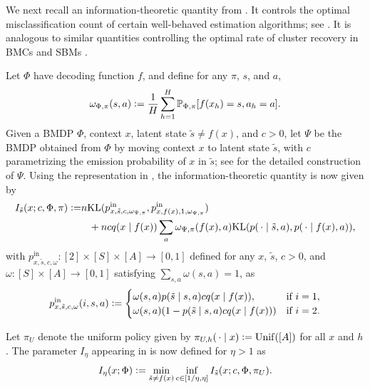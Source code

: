 \documentclass[11pt]{article}
\newcommand{\eqdef}{\vcentcolon=}
\newcommand{\mbbP}{\mathbb{P}}
\newcommand{\KL}{\textnormal{KL}}
\theoremstyle{definition}
\theoremstyle{definition}
\begin{document}
We next recall an information-theoretic quantity from \cite{Jedra:2022}.
It controls the optimal misclassification count of certain well-behaved estimation algorithms; see \cite[Theorem 1]{Jedra:2022}.
It is analogous to similar quantities controlling the optimal rate of cluster recovery in \glspl{BMC} \cite{Sanders:2020} and \glspl{SBM} \cite{zhang2016minimax, yun2016optimal}.

Let $\Phi$ have decoding function $f$, and define for any $\pi$, $s$, and $a$,
\begin{equation}
	\label{eqn:definition_of_visitation_probabilities}
	\omega_{\Phi,\pi}(s,a)
	\eqdef
	\frac{1}{H}\sum_{h=1}^H\mbbP_{\Phi,\pi}[f(x_h)=s,a_{h}=a]
	.
\end{equation}
Given a \gls{BMDP} $\Phi$, context $x$, latent state $\tilde{s}\neq f(x)$, and $c>0$, let $\Psi$ be the \gls{BMDP} obtained from $\Phi$ by moving context $x$ to latent state $\tilde{s}$, with $c$ parametrizing the emission probability of $x$ in $\tilde{s}$; see \cite[Appendix D]{Jedra:2022} for the detailed construction of $\Psi$.
Using the representation in \cite[Eqn. (35)]{Jedra:2022}, the information-theoretic quantity is now given by
\begin{align}
	I_{\tilde{s}}(x;c,\Phi,\pi)
	\eqdef
	 &
	n
	\KL(
	p^{\mathrm{in}}_{x,\tilde{s},c,\omega_{\Psi,\pi}}
	,
	p^{\mathrm{in}}_{x,f(x),1,\omega_{\Psi,\pi}}
	)
	\nonumber
	\\
	 &
	\phantom{=}
	+
	n
	c
	q(x\mid f(x))
	\sum_{a}
	\omega_{\Psi,\pi}(f(x),a)
	\KL(
	p(\,\cdot\mid \tilde{s},a)
	,
	p(\,\cdot\mid f(x),a)
	)
	,
	\label{eqn:Ijxcdef}
\end{align}
with $p^{\mathrm{in}}_{x,\tilde{s},c,\omega}:[2]\times[S]\times[A]\rightarrow[0,1]$ defined for any $x$, $\tilde{s}$, $c>0$, and $\omega:[S]\times [A]\rightarrow [0,1]$ satisfying $\sum_{s,a}\omega(s,a)=1$, as
\begin{equation}
	\label{eqn:p_in_def}
	p^{\mathrm{in}}_{x,\tilde{s},c,\omega}(i,s,a)
	\eqdef
	\begin{cases}
		\omega(s,a)p(\tilde{s} \mid s,a)cq(x \mid f(x)),
		 &
		\textnormal{if } i = 1,
		\\
		\omega(s,a)(1-p(\tilde{s} \mid s,a)cq(x \mid f(x)))
		 &
		\textnormal{if } i = 2.
		\\
	\end{cases}
\end{equation}

Let $\pi_U$ denote the uniform policy given by $\pi_{U,h}(\,\cdot\mid x)\eqdef \mathrm{Unif}([A])$ for all $x$ and $h$.
The parameter $I_{\eta}$ appearing in  is now defined for $\eta>1$ as
\begin{equation}
	\label{eqn:I_eta_def}
	I_{\eta}(x;\Phi)
	\eqdef
	\min_{\tilde{s}\neq f(x)}\inf_{c\in[1/\eta,\eta]}I_{\tilde{s}}(x;c,\Phi,\pi_U)
	.
\end{equation}
\end{document}
